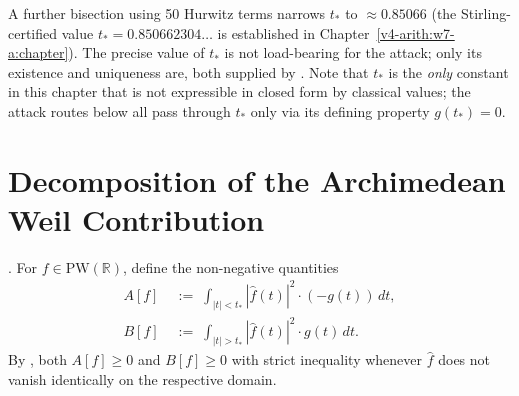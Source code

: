 \begin{remark}
\label{v4-arith:w6-a:rem:t-star-refinement}
A further bisection using 50 Hurwitz terms narrows \(t_{\ast}\) to
\(\approx 0.85066\) (the Stirling-certified value
\(t_{\ast}=0.850662304\ldots\) is established in
Chapter~\ref{v4-arith:w7-a:chapter}). The precise value of \(t_{\ast}\) is not
load-bearing for the attack; only its existence and uniqueness are,
both supplied by . Note that
\(t_{\ast}\) is the \emph{only} constant in this chapter that is not
expressible in closed form by classical values; the attack routes
below all pass through \(t_{\ast}\) only via its defining property
\(g(t_{\ast})=0\).
\end{remark}

\section{Decomposition of the Archimedean Weil Contribution}
\label{v4-arith:w6-a:decomposition}

\begin{definition}
\label{v4-arith:w6-a:def:core-tail}
\ClaimStatusDefinitional. For \(f\in\mathrm{PW}(\mathbb{R})\), define
the non-negative quantities
\begin{align}
\label{v4-arith:w6-a:eq:A-core}
A[f]&\;:=\;\int_{|t|<t_{\ast}}|\widehat{f}(t)|^{2}\cdot(-g(t))\,dt,\\
\label{v4-arith:w6-a:eq:B-tail}
B[f]&\;:=\;\int_{|t|>t_{\ast}}|\widehat{f}(t)|^{2}\cdot g(t)\,dt.
\end{align}
By , both \(A[f]\geq 0\) and \(B[f]\geq 0\)
with strict inequality whenever \(\widehat{f}\) does not vanish
identically on the respective domain.
\end{definition}

